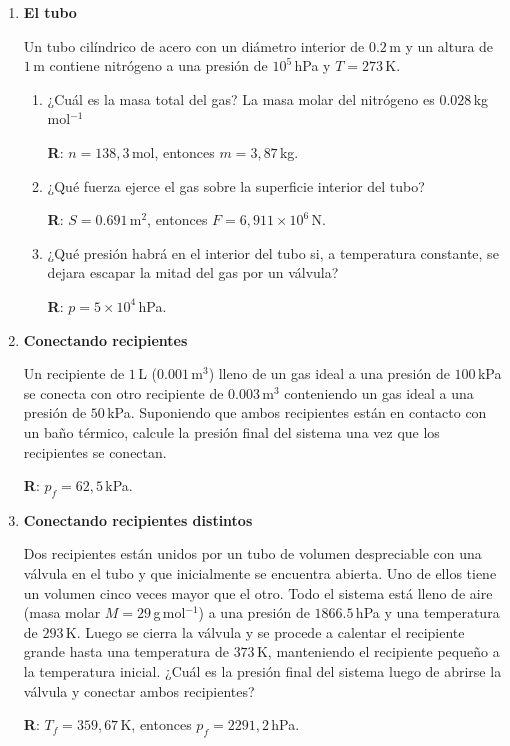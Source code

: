 \documentclass[a4paper,12pt]{article}
\begin{document}
\begin{enumerate}
	\item {\bf{El tubo}}
		
		Un tubo cilíndrico de acero con un diámetro interior de $0.2$\,m y un
		altura de $1$\,m contiene nitrógeno a una presión de $10^5$\,hPa y
		$T=273$\,K.

		\begin{enumerate}
			\item ¿Cuál es la masa total del gas? La masa molar del nitrógeno
				es $0.028$\,kg\,mol$^{-1}$
				
				{\bf R}: $n=138,3$\,mol, entonces $m=3,87$\,kg.
			\item ¿Qué fuerza ejerce el gas sobre la superficie interior del tubo?
				
				{\bf R}: $S=0.691$\,m$^2$, entonces $F=6,911 \times 10^6$\,N.
			\item ¿Qué presión habrá en el interior del tubo si, a temperatura
				constante, se dejara escapar la mitad del gas por un válvula?
				
				{\bf R}: $p=5 \times 10^4$\,hPa.
		\end{enumerate}
 
	\item {\bf{Conectando recipientes}}

		Un recipiente de $1$\,L ($0.001$\,m$^3$) lleno de un gas ideal a una
		presión de $100$\,kPa se conecta con otro recipiente de $0.003$\,m$^3$
		conteniendo un gas ideal a una presión de $50$\,kPa. Suponiendo que
		ambos recipientes están en contacto con un baño térmico, calcule la
		presión final del sistema una vez que los recipientes se conectan.

		{\bf R}: $p_f = 62,5$\,kPa.

	\item {\bf{Conectando recipientes distintos}}
	
		Dos recipientes están unidos por un tubo de volumen despreciable con
		una válvula en el tubo y que inicialmente se encuentra abierta. Uno de
		ellos tiene un volumen cinco veces mayor que el otro. Todo el sistema
		está lleno de aire (masa molar $M=29$\,g\,mol$^{-1}$) a una presión de
		$1866.5$\,hPa y una temperatura de $293$\,K. Luego se cierra la válvula
		y se procede a calentar el recipiente grande hasta una temperatura de
		$373$\,K, manteniendo el recipiente pequeño a la temperatura inicial.
		¿Cuál es la presión final del sistema luego de abrirse la válvula y
		conectar ambos recipientes? 
	
		{\bf R}: $T_f = 359,67$\,K, entonces $p_f = 2291,2$\,hPa.


\end{enumerate}
\end{document}
